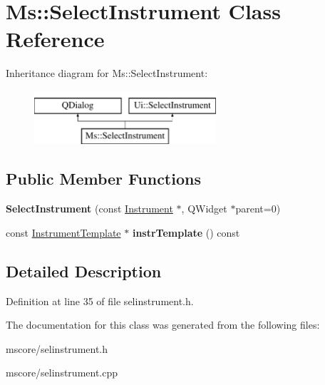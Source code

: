 \hypertarget{class_ms_1_1_select_instrument}{}\section{Ms\+:\+:Select\+Instrument Class Reference}
\label{class_ms_1_1_select_instrument}
Inheritance diagram for Ms\+:\+:Select\+Instrument\+:\begin{figure}[H]
\begin{center}
\leavevmode
\includegraphics[height=2.000000cm]{class_ms_1_1_select_instrument}
\end{center}
\end{figure}
\subsection*{Public Member Functions}
\begin{DoxyCompactItemize}
\item 
\mbox{\label{class_ms_1_1_select_instrument_ada2fb30846a19fab037699caa9e19094}} 
{\bfseries Select\+Instrument} (const \hyperlink{class_ms_1_1_instrument}{Instrument} $\ast$, Q\+Widget $\ast$parent=0)
\item 
\mbox{\label{class_ms_1_1_select_instrument_a442df6fc64ac7703f7873ee27a86b8a3}} 
const \hyperlink{class_ms_1_1_instrument_template}{Instrument\+Template} $\ast$ {\bfseries instr\+Template} () const
\end{DoxyCompactItemize}


\subsection{Detailed Description}


Definition at line 35 of file selinstrument.\+h.



The documentation for this class was generated from the following files\+:\begin{DoxyCompactItemize}
\item 
mscore/selinstrument.\+h\item 
mscore/selinstrument.\+cpp\end{DoxyCompactItemize}
